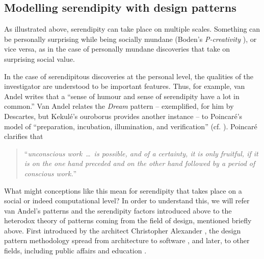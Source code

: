 \documentclass{llncs}
\begin{document}
\subsection{Modelling serendipity with design patterns} \label{sec:unified-approach}

As illustrated above, serendipity can take place on multiple scales.
Something can be personally surprising while being socially mundane
(Boden's \emph{P-creativity} \cite{boden}), or vice versa, as in
the case of personally mundane discoveries that take on surprising
social value.

In the case of serendipitous discoveries at the personal level, the
qualities of the investigator are understood to be important features.
Thus, for example, van Andel writes that a ``sense of humour and
  sense of serendipity have a lot in common.'' 
% 
Van Andel relates the \emph{Dream} pattern -- exemplified, for him by
Descartes, but Kekul\'e's ouroborus provides another instance -- to
Poincar\'e's \cite{poincare1910creation,poincare2013science} model of
``preparation, incubation, illumination, and verification''
(cf. \cite{wallas1926art}).  Poincar\'e \cite{poincare1910creation}
clarifies that
\begin{quote}
``\emph{unconscious work}~\ldots~\emph{is possible, and of a
    certainty, it is only fruitful, if it is on the one hand preceded
    and on the other hand followed by a period of conscious work.}''
\end{quote}

What might conceptions like this mean for serendipity that takes place
on a social or indeed computational level?  In order to understand
this, we will refer van Andel's patterns and the serendipity factors
introduced above to the heterodox theory of patterns coming from the
field of design, mentioned briefly above.  First introduced by the
architect Christopher Alexander
\cite{alexander1979timeless,alexander1977pattern}, the design pattern
methodology spread from architecture to software
\cite{gabriel1996patterns}, and later, to other fields, including
public affairs \cite{schuler2008liberating} and education
\cite{bergin2012pedagogical}.
\end{document}
